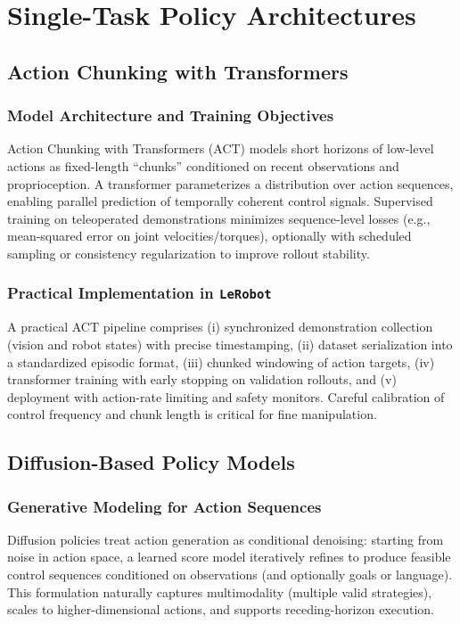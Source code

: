 \section{Single-Task Policy Architectures}
\label{sec:single}

\subsection{Action Chunking with Transformers}
\subsubsection{Model Architecture and Training Objectives}
Action Chunking with Transformers (ACT) models short horizons of low-level actions as fixed-length ``chunks'' conditioned on recent observations and proprioception. A transformer parameterizes a distribution over action sequences, enabling parallel prediction of temporally coherent control signals. Supervised training on teleoperated demonstrations minimizes sequence-level losses (e.g., mean-squared error on joint velocities/torques), optionally with scheduled sampling or consistency regularization to improve rollout stability.

\subsubsection{Practical Implementation in \texttt{LeRobot}}
A practical ACT pipeline comprises (i) synchronized demonstration collection (vision and robot states) with precise timestamping, (ii) dataset serialization into a standardized episodic format, (iii) chunked windowing of action targets, (iv) transformer training with early stopping on validation rollouts, and (v) deployment with action-rate limiting and safety monitors. Careful calibration of control frequency and chunk length is critical for fine manipulation.

\subsection{Diffusion-Based Policy Models}
\subsubsection{Generative Modeling for Action Sequences}
Diffusion policies treat action generation as conditional denoising: starting from noise in action space, a learned score model iteratively refines to produce feasible control sequences conditioned on observations (and optionally goals or language). This formulation naturally captures multimodality (multiple valid strategies), scales to higher-dimensional actions, and supports receding-horizon execution.

